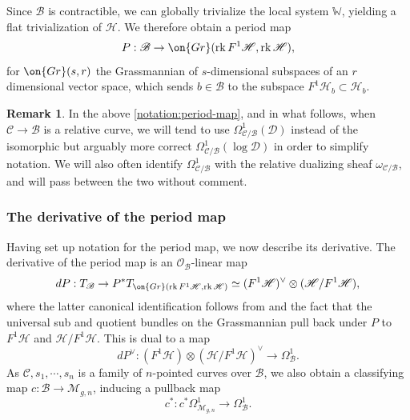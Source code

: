 \documentclass[12 pt]{amsart}
\theoremstyle{plain}
\theoremstyle{definition}
\newtheorem{remark}[subsubsection]{Remark}
\theoremstyle{remark}
\numberwithin{equation}{section}
\DeclareMathOperator\rk{rk}
\begin{document}
Since $\mathscr{B}$ is contractible, we can globally trivialize the local system $\mathbb W$, yielding a flat trivialization of $\mathscr{H}$. 
We therefore obtain a period map
\begin{align}
	\label{equation:period-map}
	P: \mathscr{B} \to \on{Gr}(\rk F^1 \mathscr H, \rk \mathscr H),
\end{align}
for $\on{Gr}(s, r)$ the Grassmannian of $s$-dimensional subspaces of an $r$
dimensional vector space, which sends $b\in \mathscr{B}$ to the subspace $F^1\mathscr{H}_b\subset \mathscr{H}_b$. 

\begin{remark}
	\label{remark:}
	In the above \autoref{notation:period-map}, and in what follows,
	when $\mathscr C \to \mathscr B$ is a relative curve, we will tend to use
	$\Omega^1_{\mathscr C/\mathscr B}(\mathscr D)$ instead of the isomorphic but arguably more correct
	$\Omega^1_{\mathscr C/\mathscr B}(\log \mathscr D)$
	in order to simplify notation. 
	We will also often identify $\Omega^1_{\mathscr{C}/\mathscr{B}}$ with the relative dualizing sheaf $\omega_{\mathscr{C}/\mathscr{B}}$, and will pass between the two without comment.
\end{remark}

\subsubsection{The derivative of the period map}
\label{subsubsection:derivative-period-map-2}

Having set up notation for the period map, we now describe its derivative.
The derivative of the period map is an $\mathscr{O}_{\mathscr{B}}$-linear map
\begin{align*}
	dP : T_{\mathscr B} \to P^* T_{\on{Gr}(\rk F^1 \mathscr H, \rk \mathscr H)} \simeq (F^1
	\mathscr H)^\vee \otimes (\mathscr H/F^1 \mathscr H),
\end{align*}
where the latter canonical identification follows from \cite[Theorem 3.5]{eisenbudH:3264-&-all-that}
and the fact that the universal sub and quotient bundles on the Grassmannian
pull back under $P$ to $F^1 \mathscr H$ and 
$\mathscr H/F^1 \mathscr H$.
This is dual to a map
$$dP^\vee: (F^1\mathscr{H})\otimes
(\mathscr{H}/F^1\mathscr{H})^\vee\to \Omega^1_{\mathscr B}.$$ As $\mathscr{C},
s_1, \cdots, s_n$ is a family of $n$-pointed curves over $\mathscr{B}$, we also
obtain a classifying map $c: \mathscr{B}\to \mathscr{M}_{g,n}$, inducing a
pullback map $$c^*: c^*\Omega^1_{\mathscr{M}_{g,n}}\to \Omega^1_{\mathscr B}.$$
\end{document}
